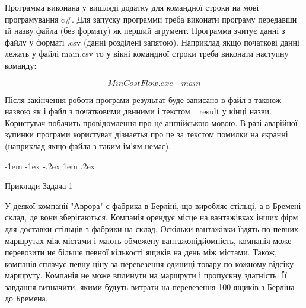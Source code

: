 \documentclass[a4paper,14pt,russian,ukrainian,oneside,final]{extreport}
\makeatletter
\newlength{\fivecharsapprox}
\newlength{\fivecharsapproxs}
\renewcommand\section{%
  \clearpage\@startsection {section}{0}%
    {\fivecharsapproxs}%
    {-1em \@plus -1ex \@minus -.2ex}%
    {1em \@plus .2ex}%
    {\raggedright\hyphenpenalty=10000\normalfont\large\bfseries\MakeUppercase {}}
}
\makeatother
\begin{document}
Программа виконана у вишляді додатку для командної строки на мові програмування c\#.
Для запуску программи треба виконати програму передавши їй назву файла (без формату) як перший агрумент. Программа зчитує данні з файлу у форматі .csv (данні розділені запятою).
Наприклад якщо початкові данні лежать у файлі main.csv то у вікні командної строки треба виконати наступну команду:

$$MinCostFlow.exe \quad main$$

Після закінчення роботи програми результат буде записано в файл з такоюж назвою як і файл з початковими двнними і текстом \_result у кінці назви.
Користувач побачить провідомлення про це англійською мовою.
В разі аварійної зупинки програми користувач дізнаетья про це за текстом помилки на єкранні (наприклад якщо файла з таким ім'ям немає).

\section{Приклади}
Задача 1

\indent У деякої компанії "Аврора" є фабрика в Берліні, що виробляє стільці, а в Бремені склад, де вони зберігаються. Компанія орендує місце на вантажівках інших фірм для доставки стільців з фабрики на склад. Оскільки вантажівки їздять по певних маршрутах між містами і мають обмежену вантажопідйомність, компанія може перевозити не більше певної кількості ящиків на день між містами. Також, компанія сплачує певну ціну за перевезення одиниці товару по кожному відсіку маршруту. Компанія не може вплинути на маршрути і пропускну здатність. Її завдання визначити, якими будуть витрати на перевезення 100 ящиків з Берліна до Бремена.
\end{document}
